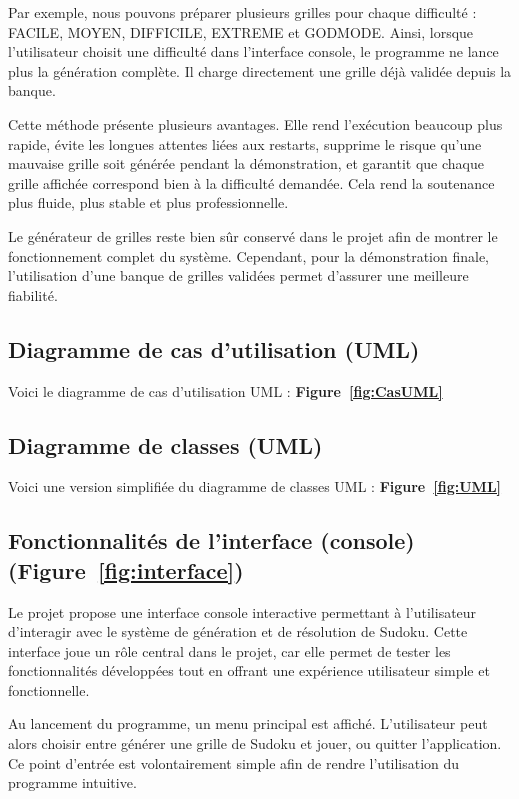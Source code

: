 \documentclass[a4paper]{article}
\begin{document}
Par exemple, nous pouvons préparer plusieurs grilles pour chaque difficulté : FACILE, MOYEN, DIFFICILE, EXTREME et GODMODE. Ainsi, lorsque l’utilisateur choisit une difficulté dans l’interface console, le programme ne lance plus la génération complète. Il charge directement une grille déjà validée depuis la banque.

Cette méthode présente plusieurs avantages. Elle rend l’exécution beaucoup plus rapide, évite les longues attentes liées aux restarts, supprime le risque qu’une mauvaise grille soit générée pendant la démonstration, et garantit que chaque grille affichée correspond bien à la difficulté demandée. Cela rend la soutenance plus fluide, plus stable et plus professionnelle.

Le générateur de grilles reste bien sûr conservé dans le projet afin de montrer le fonctionnement complet du système. Cependant, pour la démonstration finale, l’utilisation d’une banque de grilles validées permet d’assurer une meilleure fiabilité.


\subsection{Diagramme de cas d’utilisation (UML)}
Voici le diagramme de cas d'utilisation UML : \textbf{Figure~\ref{fig:CasUML}}

\subsection{Diagramme de classes (UML)}
Voici une version simplifiée du diagramme de classes UML : \textbf{Figure~\ref{fig:UML}}


\subsection{Fonctionnalités de l’interface (console) (\textbf{Figure~\ref{fig:interface}})}
Le projet propose une interface console interactive permettant à l’utilisateur d’interagir avec le système de génération et de résolution de Sudoku. Cette interface joue un rôle central dans le projet, car elle permet de tester les fonctionnalités développées tout en offrant une expérience utilisateur simple et fonctionnelle.

Au lancement du programme, un menu principal est affiché. L’utilisateur peut alors choisir entre générer une grille de Sudoku et jouer, ou quitter l’application. Ce point d’entrée est volontairement simple afin de rendre l’utilisation du programme intuitive.
\end{document}

